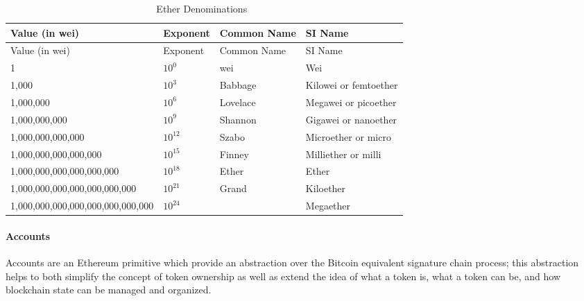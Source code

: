 \begin{center}
    \footnotesize
    \begin{longtabu} to 
    \caption{Ether Denominations~\cite{mastering-ethereum}}\label{tab:eth-denominations} \\
    \toprule
    Value (in wei)                    & Exponent & Common Name & SI Name \\
    \midrule
    \endfirsthead
    \toprule
    Value (in wei)                    & Exponent & Common Name & SI Name \\
    \midrule
    \endhead
    1                                 & $10^{0}$    & wei       & Wei \\
    1,000                             & $10^{3}$    & Babbage   & Kilowei or femtoether \\
    1,000,000                         & $10^{6}$    & Lovelace  & Megawei or picoether \\
    1,000,000,000                     & $10^{9}$    & Shannon   & Gigawei or nanoether \\
    1,000,000,000,000                 & $10^{12}$   & Szabo     & Microether or micro \\
    1,000,000,000,000,000             & $10^{15}$   & Finney    & Milliether or milli \\
    1,000,000,000,000,000,000         & $10^{18}$   & Ether     & Ether \\
    1,000,000,000,000,000,000,000     & $10^{21}$   & Grand     & Kiloether \\
    1,000,000,000,000,000,000,000,000 & $10^{24}$   &           & Megaether \\

    \bottomrule
  \end{longtabu}
\end{center}

\paragraph{Accounts}
Accounts are an Ethereum primitive which provide an abstraction over the Bitcoin
equivalent signature chain process; this abstraction helps to both simplify the
concept of token ownership as well as extend the idea of what a token is, what a
token can be, and how blockchain state can be managed and organized.

